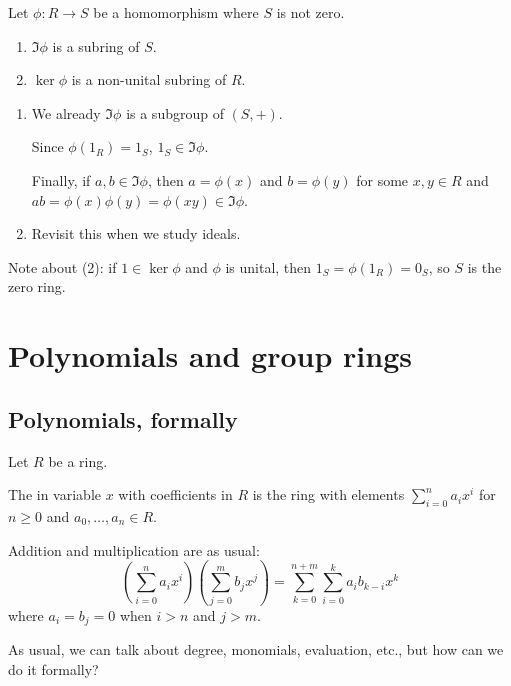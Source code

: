 \documentclass[12pt,letterpaper]{report}
\begin{document}
\begin{prop}{}{}
  Let $\phi \colon R \to S$ be a homomorphism where $S$ is not zero.
  \begin{enumerate}
    \item $\Im\phi$ is a subring of $S$.
    \item $\ker\phi$ is a non-unital subring of $R$.
  \end{enumerate}
\end{prop}

\begin{thmproof}
  \begin{enumerate}
    \item We already $\Im\phi$ is a subgroup of $(S, +)$.

    Since $\phi(1_R) = 1_S$, $1_S \in \Im\phi$.

    Finally, if $a, b \in \Im\phi$, then $a = \phi(x)$ and $b = \phi(y)$ for some $x, y \in R$ and
    $ab = \phi(x)\phi(y) = \phi(xy) \in \Im\phi$.

    \item Revisit this when we study ideals.
  \end{enumerate}
\end{thmproof}

Note about (2): if $1 \in \ker\phi$ and $\phi$ is unital, then $1_S = \phi(1_R) = 0_S$, so $S$ is
the zero ring.

\section{Polynomials and group rings}

\subsection{Polynomials, formally}

Let $R$ be a ring.

The  in variable $x$ with coefficients in $R$ is the ring with elements
$\sum_{i = 0}^n a_i x^i$ for $n \geq 0$ and $a_0, \ldots, a_n \in R$.

Addition and multiplication are as usual:
\[
  \left(\sum_{i = 0}^n a_i x^i\right) \left(\sum_{j = 0}^m b_j x^j\right)
    = \sum_{k = 0}^{n + m} \sum_{i = 0}^k a_i b_{k - i} x^k
\]
where $a_i = b_j = 0$ when $i > n$ and $j > m$.

As usual, we can talk about degree, monomials, evaluation, etc., but how can we do it formally?
\end{document}
